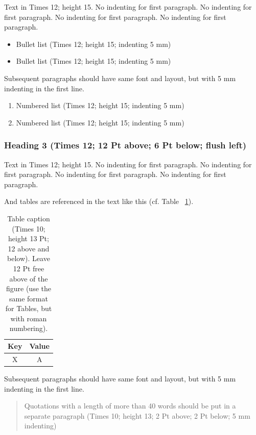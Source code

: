 \documentclass{CML_Seminar_Template}
\begin{document}
Text in Times 12; height 15. No indenting for first paragraph. No indenting for first paragraph. No indenting for first paragraph. No indenting for first paragraph. 

\begin{itemize}
\item Bullet list (Times 12; height 15; indenting 5 mm) 
\item Bullet list (Times 12; height 15; indenting 5 mm) 
\end{itemize}

Subsequent paragraphs should have same font and layout, but with 5 mm indenting in the first line. 

\begin{enumerate}
\item Numbered list (Times 12; height 15; indenting 5 mm)
\item Numbered list (Times 12; height 15; indenting 5 mm)
\end{enumerate}
 
\subsubsection{Heading 3 (Times 12; 12 Pt above; 6 Pt below; flush left)}

Text in Times 12; height 15. No indenting for first paragraph. No indenting for first paragraph. No indenting for first paragraph. No indenting for first paragraph. 

And tables are referenced in the text like this (cf. Table ~\ref{CML_Seminar_Template_tab1}).

\begin{table}
\begin{center}
\begin{tabular}{ |c|c|} 
 \hline
 Key & Value \\
 \hline
 X & A \\
 \hline
\end{tabular}
\end{center}
    \caption{\label{CML_Seminar_Template_tab1} Table caption (Times 10; height 13 Pt; 12 above and below). Leave 12 Pt free above of the figure (use the same format for Tables, but with roman numbering). }
\end{table}

Subsequent paragraphs should have same font and layout, but with 5 mm indenting in the first line. 

\begin{quote}
Quotations with a length of more than 40 words should be put in a separate paragraph (Times 10; height 13; 2 Pt above; 2 Pt below; 5 mm indenting)
\end{quote}
\end{document}
